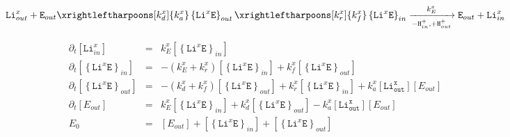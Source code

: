 \documentclass[aps,onecolumn]{revtex4}
\newcommand{\mychem}[1]{\mathtt{#1}}
\newcommand{\myconc}[1]{\left\lbrack{#1}\right\rbrack}
\begin{document}
\begin{equation}
	 \mychem{Li}_{out}^{x} +  \mychem{E}_{out}  
	 \xrightleftharpoons[k_d^x]{k_a^x} 
	 \left\lbrace\mychem{Li}^{x}\mychem{E}\right\rbrace_{out} 
	  \xrightleftharpoons[k_r^x]{k_f^x} 
	  \left\lbrace\mychem{Li}^{x}\mychem{E}\right\rbrace_{in}  
	   \xrightarrow[-\mychem{H}^+_{in},+\mychem{H}^+_{out}]{k_E^x} \mychem{E}_{out}  + \mychem{Li}_{in}^{x}
\end{equation}

\begin{equation}
\begin{array}{rcl}
	\partial_t \myconc{\mychem{Li}_{in}^x} & = & k_E^x \myconc{\left\lbrace\mychem{Li}^{x}\mychem{E}\right\rbrace_{in} } \\
	\partial_t \myconc{\left\lbrace\mychem{Li}^{x}\mychem{E}\right\rbrace_{in} } & = & 
	-\left(k_E^x+k_r^x\right) \myconc{\left\lbrace\mychem{Li}^{x}\mychem{E}\right\rbrace_{in} }
	+k_f^x \myconc{\left\lbrace\mychem{Li}^{x}\mychem{E}\right\rbrace_{out} }
	\\
	\partial_t \myconc{\left\lbrace\mychem{Li}^{x}\mychem{E}\right\rbrace_{out} } & = &
	-\left(k_d^x+k_f^x\right) \myconc{\left\lbrace\mychem{Li}^{x}\mychem{E}\right\rbrace_{out} } 
	+k_r^x \myconc{\left\lbrace\mychem{Li}^{x}\mychem{E}\right\rbrace_{in} }
	+k_a^x \myconc{\mychem{Li_{out}^x}} \myconc{E_{out}}
	\\
	\partial_t  \myconc{E_{out}} & = & k_E^x \myconc{\left\lbrace\mychem{Li}^{x}\mychem{E}\right\rbrace_{in} }
	+k_d^x \myconc{\left\lbrace\mychem{Li}^{x}\mychem{E}\right\rbrace_{out} }
		-k_a^x \myconc{\mychem{Li_{out}^x}} \myconc{E_{out}}
	\\
	E_0 & = & \myconc{E_{out}} + \myconc{\left\lbrace\mychem{Li}^{x}\mychem{E}\right\rbrace_{in} } 
	+ \myconc{\left\lbrace\mychem{Li}^{x}\mychem{E}\right\rbrace_{out} }\\
\end{array}
\end{equation}
\end{document}
